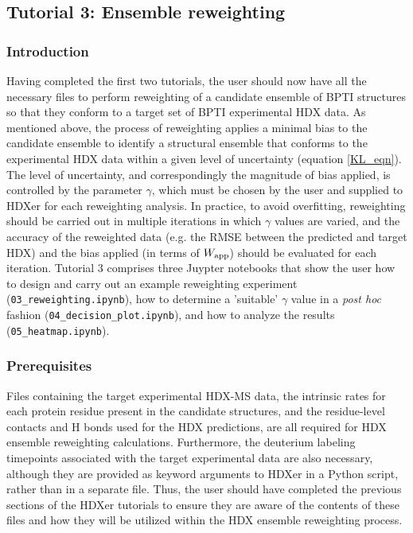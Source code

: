 \documentclass[9pt,tutorial]{livecoms}
\begin{document}
\subsection{Tutorial 3: Ensemble reweighting}\label{tutorial_3}

\subsubsection{Introduction}

Having completed the first two tutorials, the user should now have all the necessary files to perform reweighting of a candidate ensemble of BPTI structures so that they conform to a target set of BPTI experimental HDX data.
As mentioned above, the process of reweighting applies a minimal bias to the candidate ensemble to identify a structural ensemble that conforms to the experimental HDX data within a given level of uncertainty (equation \ref{KL_eqn}).
The level of uncertainty, and correspondingly the magnitude of bias applied, is controlled by the parameter $\gamma$, which must be chosen by the user and supplied to HDXer for each reweighting analysis.
In practice, to avoid overfitting, reweighting should be carried out in multiple iterations in which $\gamma$ values are varied, and the accuracy of the reweighted data (e.g. the RMSE between the predicted and target HDX) and the bias applied (in terms of $W_\textnormal{app}$) should be evaluated for each iteration.
Tutorial 3 comprises three Juypter notebooks that show the user how to design and carry out an example reweighting experiment (\texttt{03\_reweighting.ipynb}), how to determine a 'suitable' $\gamma$ value in a \textit{post hoc} fashion (\texttt{04\_decision\_plot.ipynb}), and how to analyze the results (\texttt{05\_heatmap.ipynb}). 

\subsubsection{Prerequisites}

Files containing the target experimental HDX-MS data, the intrinsic rates for each protein residue present in the candidate structures, and the residue-level contacts and H bonds used for the HDX predictions, are all required for HDX ensemble reweighting calculations.
Furthermore, the deuterium labeling timepoints associated with the target experimental data are also necessary, although they are provided as keyword arguments to HDXer in a Python script, rather than in a separate file.
Thus, the user should have completed the previous sections of the HDXer tutorials to ensure they are aware of the contents of these files and how they will be utilized within the HDX ensemble reweighting process.
\end{document}
